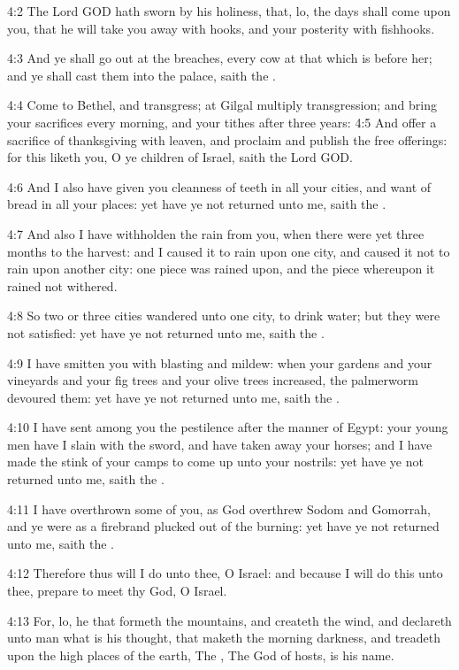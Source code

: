 4:2 The Lord GOD hath sworn by his holiness, that, lo, the days shall come upon you, that he will take you away with hooks, and your posterity with fishhooks.

4:3 And ye shall go out at the breaches, every cow at that which is before her; and ye shall cast them into the palace, saith the \LORD.

4:4 Come to Bethel, and transgress; at Gilgal multiply transgression; and bring your sacrifices every morning, and your tithes after three years: 4:5 And offer a sacrifice of thanksgiving with leaven, and proclaim and publish the free offerings: for this liketh you, O ye children of Israel, saith the Lord GOD.

4:6 And I also have given you cleanness of teeth in all your cities, and want of bread in all your places: yet have ye not returned unto me, saith the \LORD.

4:7 And also I have withholden the rain from you, when there were yet three months to the harvest: and I caused it to rain upon one city, and caused it not to rain upon another city: one piece was rained upon, and the piece whereupon it rained not withered.

4:8 So two or three cities wandered unto one city, to drink water; but they were not satisfied: yet have ye not returned unto me, saith the \LORD.

4:9 I have smitten you with blasting and mildew: when your gardens and your vineyards and your fig trees and your olive trees increased, the palmerworm devoured them: yet have ye not returned unto me, saith the \LORD.

4:10 I have sent among you the pestilence after the manner of Egypt: your young men have I slain with the sword, and have taken away your horses; and I have made the stink of your camps to come up unto your nostrils: yet have ye not returned unto me, saith the \LORD.

4:11 I have overthrown some of you, as God overthrew Sodom and Gomorrah, and ye were as a firebrand plucked out of the burning: yet have ye not returned unto me, saith the \LORD.

4:12 Therefore thus will I do unto thee, O Israel: and because I will do this unto thee, prepare to meet thy God, O Israel.

4:13 For, lo, he that formeth the mountains, and createth the wind, and declareth unto man what is his thought, that maketh the morning darkness, and treadeth upon the high places of the earth, The \LORD, The God of hosts, is his name.

